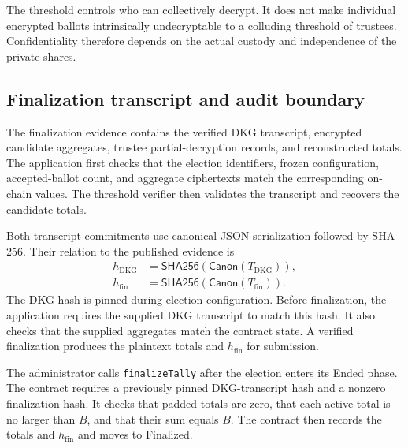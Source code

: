 The threshold controls who can collectively decrypt. It does not make
individual encrypted ballots intrinsically undecryptable to a colluding
threshold of trustees. Confidentiality therefore depends on the actual
custody and independence of the private shares.


\subsection{Finalization transcript and audit boundary}
\label{subsec:protocol-finalization}

The finalization evidence contains the verified DKG transcript, encrypted
candidate aggregates, trustee partial-decryption records, and reconstructed
totals. The application first checks that the election identifiers, frozen
configuration, accepted-ballot count, and aggregate ciphertexts match the
corresponding on-chain values. The threshold verifier then validates the
transcript and recovers the candidate totals.

Both transcript commitments use canonical JSON serialization followed by
SHA-256. Their relation to the published evidence is
\begin{equation}
\label{eq:protocol-transcript-hash}
\begin{aligned}
 h_{\mathrm{DKG}}&=\mathsf{SHA256}
 (\mathsf{Canon}(T_{\mathrm{DKG}})),\\
 h_{\mathrm{fin}}&=\mathsf{SHA256}
 (\mathsf{Canon}(T_{\mathrm{fin}})).
\end{aligned}
\end{equation}
The DKG hash is pinned during election configuration. Before finalization,
the application requires the supplied DKG transcript to match this hash.
It also checks that the supplied aggregates match the contract state.
A verified finalization produces the plaintext totals and
$h_{\mathrm{fin}}$ for submission.

The administrator calls \texttt{finalizeTally} after the election enters its
Ended phase. The contract requires a previously pinned DKG-transcript hash
and a nonzero finalization hash. It checks that padded totals are zero,
that each active total is no larger than $B$, and that their sum equals
$B$. The contract then records the totals and $h_{\mathrm{fin}}$ and moves
to Finalized.

